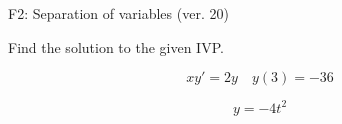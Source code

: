 \begin{exercise}
  \begin{exerciseTitle}F2: Separation of variables (ver. 20)\end{exerciseTitle}
  \begin{exerciseStatement}
    
Find the solution to the given IVP.

    
\[xy'= 2 y \hspace{1em} y( 3 ) = -36\]

  \end{exerciseStatement}
  \begin{exerciseAnswer}
    
\[y= -4 t^ 2\]

  \end{exerciseAnswer}
\end{exercise}